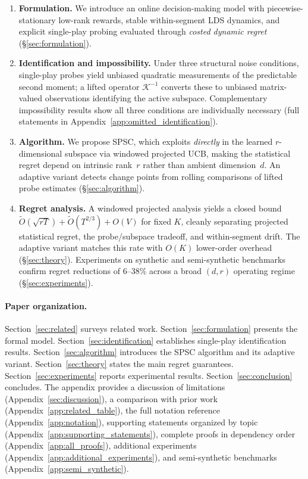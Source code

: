 \documentclass{article}
\begin{document}
\begin{enumerate}[leftmargin=1.5em, itemsep=2pt]
\item \textbf{Formulation.} We introduce an online decision-making model with piecewise-stationary low-rank rewards, stable within-segment LDS dynamics, and explicit single-play probing evaluated through \emph{costed dynamic regret} (\S\ref{sec:formulation}).

\item \textbf{Identification and impossibility.} Under three structural noise conditions, single-play probes yield unbiased quadratic measurements of the predictable second moment; a lifted operator $\mathcal{K}^{-1}$ converts these to unbiased matrix-valued observations identifying the active subspace.
Complementary impossibility results show all three conditions are individually necessary (full statements in Appendix~\ref{app:omitted_identification}).

\item \textbf{Algorithm.} We propose SPSC, which exploits \emph{directly} in the learned $r$-dimensional subspace via windowed projected UCB, making the statistical regret depend on intrinsic rank~$r$ rather than ambient dimension~$d$.
An adaptive variant detects change points from rolling comparisons of lifted probe estimates (\S\ref{sec:algorithm}).

\item \textbf{Regret analysis.} A windowed projected analysis yields a closed bound $\widetilde{O}(\sqrt{rT}) + \widetilde{O}(T^{2/3}) + O(V)$ for fixed $K$, cleanly separating projected statistical regret, the probe/subspace tradeoff, and within-segment drift.
The adaptive variant matches this rate with $O(K)$ lower-order overhead (\S\ref{sec:theory}).
Experiments on synthetic and semi-synthetic benchmarks confirm regret reductions of 6--38\% across a broad $(d,r)$ operating regime (\S\ref{sec:experiments}).
\end{enumerate}

\paragraph{Paper organization.}
Section~\ref{sec:related} surveys related work.
Section~\ref{sec:formulation} presents the formal model.
Section~\ref{sec:identification} establishes single-play identification results.
Section~\ref{sec:algorithm} introduces the SPSC algorithm and its adaptive variant.
Section~\ref{sec:theory} states the main regret guarantees.
Section~\ref{sec:experiments} reports experimental results.
Section~\ref{sec:conclusion} concludes.
The appendix provides a discussion of limitations (Appendix~\ref{sec:discussion}), a comparison with prior work (Appendix~\ref{app:related_table}), the full notation reference (Appendix~\ref{app:notation}), supporting statements organized by topic (Appendix~\ref{app:supporting_statements}), complete proofs in dependency order (Appendix~\ref{app:all_proofs}), additional experiments (Appendix~\ref{app:additional_experiments}), and semi-synthetic benchmarks (Appendix~\ref{app:semi_synthetic}).
\end{document}
